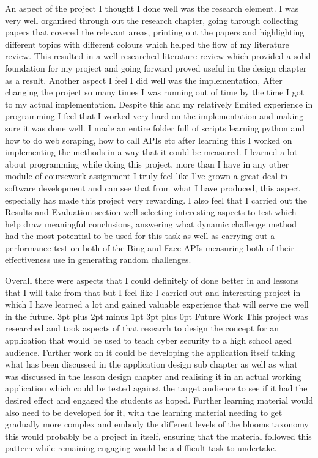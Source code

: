 \documentclass[12pt,a4paper]{article}
\makeatletter
\renewcommand\subsection{\@startsection {subsection}{1}{2mm} %
                               {3pt plus 2pt minus 1pt} %
                               {3pt plus 0pt} %
                               {\normalfont\bfseries}}
\makeatother
\begin{document}
An aspect of the project I thought I done well was the research element. I was very well organised through out the research chapter, going through collecting papers that covered the relevant areas, printing out the papers and highlighting different topics with different colours which helped the flow of my literature review. This resulted in a well researched literature review which provided a solid foundation for my project and going forward proved useful in the design chapter as a result. Another aspect I feel I did well was the implementation, After changing the project so many times I was running out of time by the time I got to my actual implementation. Despite this and my relatively limited experience in programming I feel that I worked very hard on the implementation and making sure it was done well. I made an entire folder full of scripts learning python and how to do web scraping, how to call APIs etc after learning this I worked on implementing the methods in a way that it could be measured. I learned a lot about programming while doing this project, more than I have in any other module of coursework assignment I truly feel like I've grown a great deal in software development and can see that from what I have produced, this aspect especially has made this project very rewarding. I also feel that I carried out the Results and Evaluation section well selecting interesting aspects to test which help draw meaningful conclusions, answering what dynamic challenge method had the most potential to be used for this task as well as carrying out a performance test on both of the Bing and Face APIs measuring both of their effectiveness use in generating random challenges. 

Overall there were aspects that I could definitely of done better in and lessons that I will take from that but I feel like I carried out and interesting project in which I have learned a lot and gained valuable experience that will serve me well in the future.
\subsection{Future Work} 
This project was researched and took aspects of that research to design the concept for an application that would be used to teach cyber security to a high school aged audience. Further work on it could be developing the application itself taking what has been discussed in the application design sub chapter as well as what was discussed in the lesson design chapter and realising it in an actual working application which could be tested against the target audience to see if it had the desired effect and engaged the students as hoped. Further learning material would also need to be developed for it, with the learning material needing to get gradually more complex and embody the different levels of the blooms taxonomy this would probably be a project in itself, ensuring that the material followed this pattern while remaining engaging would be a difficult task to undertake.  
\end{document}
